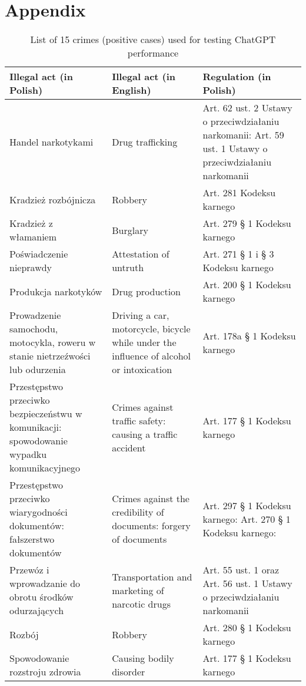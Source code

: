\documentclass[preprint,12pt,number]{elsarticle}
\begin{document}
%

\newpage
\section*{Appendix}

\begin{table}[h]
\centering
\caption{List of 15 crimes (positive cases) used for testing ChatGPT performance}
\label{tab:crimes-list}
\footnotesize
\begin{tabular}{|p{5cm}|p{5cm}|p{5cm}|}
\hline
\textbf{Illegal act (in Polish)}  & \textbf{Illegal act (in English) }  & \textbf{Regulation (in Polish)  }            \\ \hline
Handel narkotykami   & Drug trafficking  & Art. 62 ust. 2 Ustawy o   przeciwdziałaniu narkomanii: Art. 59 ust. 1 Ustawy o przeciwdziałaniu   narkomanii 
\\ \hline
Kradzież rozbójnicza   & Robbery   & Art. 281 Kodeksu karnego 
\\ \hline
Kradzież z włamaniem  & Burglary  & Art. 279 § 1 Kodeksu   karnego 
\\ \hline
Poświadczenie nieprawdy  & Attestation of untruth  & Art. 271 § 1 i § 3 Kodeksu karnego 
\\ \hline
Produkcja narkotyków & Drug production  & Art. 200 § 1 Kodeksu karnego
\\ \hline
Prowadzenie samochodu, motocykla, roweru w stanie   nietrzeźwości lub odurzenia  & Driving a car, motorcycle, bicycle while under the   influence of alcohol or intoxication & Art. 178a § 1 Kodeksu karnego 
\\ \hline
Przestępstwo przeciwko bezpieczeństwu w komunikacji: spowodowanie wypadku komunikacyjnego & Crimes against traffic safety: causing a traffic accident   & Art. 177 § 1 Kodeksu karnego 
\\ \hline
Przestępstwo przeciwko wiarygodności dokumentów:   fałszerstwo dokumentów  & Crimes against the credibility of documents: forgery of documents  & Art. 297 § 1 Kodeksu karnego: Art. 270 § 1 Kodeksu karnego:  
\\ \hline
Przewóz i wprowadzanie do obrotu środków odurzających  & Transportation and marketing of narcotic drugs   & Art. 55 ust. 1 oraz Art. 56 ust. 1 Ustawy o przeciwdziałaniu narkomanii
\\ \hline
Rozbój   & Robbery & Art. 280 § 1 Kodeksu karnego 
\\ \hline
Spowodowanie rozstroju zdrowia   & Causing bodily disorder  & Art. 177 § 1 Kodeksu   karnego 

\end{tabular}
\end{table}
\end{document}
